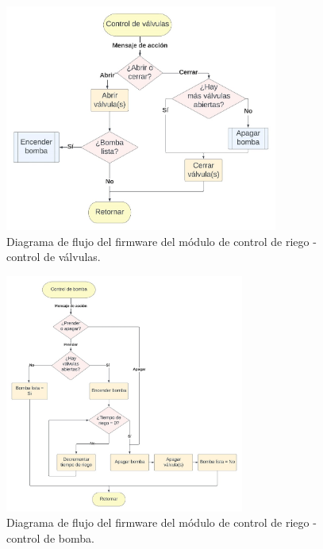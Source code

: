 \begin{figure}[!h]
	\centering
	\includegraphics[width=0.8\textwidth]{./Figures/chapter3/FirmwareValveControl.jpg}
	\caption[Diagrama de flujo del firmware del módulo de control de riego - control de válvulas]{Diagrama de flujo del firmware del módulo de control de riego - control de válvulas.}
	\label{fig:flow_valvecontrol}
\end{figure}

\begin{figure}[!h]
	\centering
	\includegraphics[width=0.7\textwidth]{./Figures/chapter3/FirmwarePumpControl.jpg}
	\caption[Diagrama de flujo del firmware del módulo de control de riego - control de bomba]{Diagrama de flujo del firmware del módulo de control de riego - control de bomba.}
	\label{fig:flow_bombacontrol}
\end{figure}







